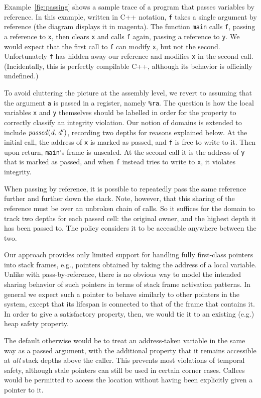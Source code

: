 \documentclass[10pt,conference]{ieeetran}%
\theoremstyle{definition}
\begin{document}
{Example~\ref{fig:passing} shows a sample trace of a program that passes
variables by reference. In this example, written in C++ notation,
{\tt f} takes a single argument by reference (the diagram displays it in magenta). The function
{\tt main} calls {\tt f}, passing a reference to {\tt x}, then clears {\tt x} and calls
{\tt f} again, passing a reference to {\tt y}.
We would expect that the first call to {\tt f} can modify
{\tt x}, but not the second. Unfortunately {\tt f} has hidden away our reference and modifies
{\tt x} in the second call. (Incidentally, this is perfectly compilable C++,
although its behavior is officially undefined.)

To avoid cluttering the picture at the assembly level, we revert to assuming that the
argument {\tt a} is passed in a register, namely {\tt \%ra}.
The question is how the local variables {\tt x} and {\tt y} themselves
should be labelled in order for the property to correctly classify an integrity violation.
Our notion of domains is extended to include \(\mathit{passed(d,d')}\),
recording two depths for reasons explained below.
At the initial call, the address of {\tt x} is marked as passed, and {\tt f} is free to write to it. Then upon
return, {\tt main}'s frame is unsealed. At the second call it is the address of {\tt y} that is marked as passed,
and when {\tt f} instead tries to write to {\tt x}, it violates integrity.


When passing by reference, it is possible to repeatedly pass the same reference further
and further down the stack. Note, however, that this sharing of the reference must be over
an unbroken chain of calls. So it suffices for the domain to track two depths for each passed
cell: the original owner, and the highest depth it has been passed to. The policy considers
it to be accessible anywhere between the two.

Our approach provides only limited support for handling fully first-class pointers into
stack frames, e.g., pointers obtained by taking the address of a local variable.
Unlike with pass-by-reference, there is no obvious way to model the intended
sharing behavior of such pointers in terms of stack frame activation patterns.
In general we expect such a pointer to behave similarly to other pointers in
the system, except that its lifespan is connected to that of the frame that contains
it. In order to give a satisfactory property, then, we would tie it to an existing (e.g.)
heap safety property.

The default otherwise would be to treat an address-taken variable in the
same way as a passed argument, with the additional property
that it remains accessible at \emph{all} stack depths above the caller.
This prevents most violations of temporal safety, although stale pointers
can still be used in certain corner cases. Callees would be permitted
to access the location without having been explicitly given a pointer
to it.

}
\end{document}

